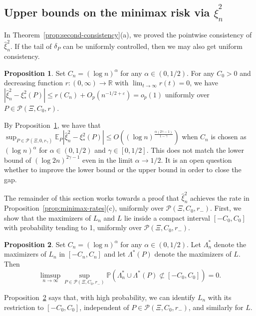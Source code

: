 \documentclass{article}
\theoremstyle{definition}
\newtheorem{proposition}{Proposition}
\newcommand*\eps{\epsilon}
\renewcommand*\epsilon{\varepsilon}
\newcommand{\R}{\mathbb{R}}
\newcommand{\1}{\mathbbm{1}}
\renewcommand{\P}{\mathbb{P}}
\begin{document}
\subsection{Upper bounds on the minimax risk via $\hat \xi_n^2$}
\label{sec:minimax-opt}
In Theorem~\ref{prop:second-consistency}(a), we proved the pointwise consistency of $\hat \xi_n^2$. If the tail of $\delta_P$ can be uniformly controlled, then we may also get uniform consistency.
\begin{proposition}
\label{prop:P(Xi,K)-unif-consistency}
    Set $C_n = (\log n)^{\alpha}$ for any $\alpha \in (0, 1/2)$. For any $C_0 > 0$ and decreasing function $r: (0, \infty) \to \R$ with $\lim_{t \to \infty} r(t) = 0$, we have $|\hat \xi_n^2 - \xi_*^2(P)|\leq  r(C_n) + O_p(n^{-1/2 + \eps}) = o_p(1)$
    uniformly over $P \in \mathcal P(\Xi,C_0, r)$.
\end{proposition}

By Proposition~\ref{prop:P(Xi,K)-unif-consistency}, we have that $\sup_{P \in \mathcal{P}(\Xi, 0, r_{\gamma})} \mathbb{E}_P |\hat{\xi}^2_n - \xi^2_*(P)| \leq O( (\log n)^{\frac{\alpha(2\gamma - 1)}{1 - \gamma}})$ when $C_n$ is chosen as $(\log n)^\alpha$ for $\alpha \in (0, 1/2)$ and $\gamma \in [0, 1/2]$. This does not match the lower bound of $(\log 2n)^{2 \gamma - 1}$ even in the limit $\alpha \rightarrow 1/2$. It is an open question whether to improve the lower bound or the upper bound in order to close the gap.

The remainder of this section works towards a proof that $\hat \xi_n^2$ achieves the rate in Proposition~\ref{prop:minimax-rates}(c), uniformly over $\mathcal P(\Xi, C_0, r_-)$. First, we show that the maximizers of $L_n$ and $L$ lie inside a compact interval $[-C_0, C_0]$ with probability tending to 1, uniformly over $\mathcal P(\Xi, C_0, r_-)$.
\begin{proposition}
\label{prop:maximizer-uniform-bound}
    Set $C_n = (\log n)^\alpha$ for any $\alpha \in (0, 1/2)$. Let $\Lambda^*_n$ denote the maximizers of $L_n$ in $[-C_n, C_n]$ and let $\Lambda^*(P)$ denote the maximizers of $L$. Then   
\[
    \limsup_{n\to\infty} \sup_{P \in \mathcal P(\Xi, C_0, r_-)} \P\left(\Lambda^*_n \cup \Lambda^*(P) \not\subset [-C_0, C_0]\right) = 0.
    \]
\end{proposition}
Proposition~\ref{prop:maximizer-uniform-bound} says that, with high probability, we can identify $L_n$ with its restriction to $[-C_0, C_0]$, independent of $P \in \mathcal P(\Xi, C_0, r_-)$, and similarly for $L$. 
\end{document}
